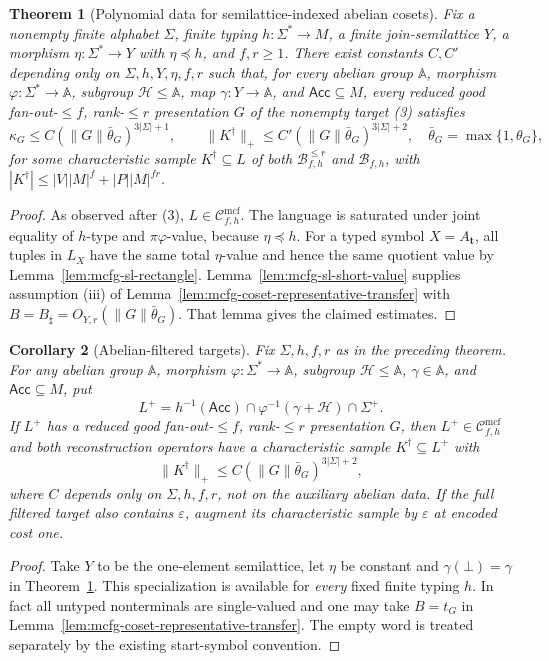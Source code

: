 \documentclass[11pt]{article}
\numberwithin{equation}{section}
\theoremstyle{plain}
\newtheorem{theorem}{Theorem}[section]
\newtheorem{corollary}[theorem]{Corollary}
\theoremstyle{definition}
\theoremstyle{remark}
\newcommand{\Cmcf}[2]{\mathcal{C}^{\mathrm{mcf}}_{#1,#2}}
\newcommand{\eps}{\varepsilon}
\theoremstyle{plain}
\begin{document}
\begin{theorem}[Polynomial data for semilattice-indexed abelian cosets]
\label{thm:mcfg-semilattice-twisted-polydata}
Fix a nonempty finite alphabet $\Sigma$, finite typing
$h:\Sigma^*\to M$, a finite join-semilattice $Y$, a morphism
$\eta:\Sigma^*\to Y$ with $\eta\preceq h$, and
$f,r\ge1$. There exist constants $C,C'$ depending only on
$\Sigma,h,Y,\eta,f,r$ such that, for every abelian group
$\mathbb A$, morphism $\varphi:\Sigma^*\to\mathbb A$,
subgroup $\mathcal H\le\mathbb A$, map $\gamma:Y\to\mathbb A$,
and $\mathsf{Acc}\subseteq M$, every reduced good
fan-out-$\le f$, rank-$\le r$ presentation $G$ of
the nonempty target (3) satisfies
\[
 \kappa_G\le C(\|G\|\bar\theta_G)^{3|\Sigma|+1},
 \qquad
 \|K^\dagger\|_+\le
 C'(\|G\|\bar\theta_G)^{3|\Sigma|+2},
 \quad\bar\theta_G=\max\{1,\theta_G\},
\]
for some characteristic sample $K^\dagger\subseteq L$
of both $\mathcal B^{\le r}_{f,h}$ and $\mathcal B_{f,h}$,
with $|K^\dagger|\le |V||M|^f+|P||M|^{fr}$.
\end{theorem}
\begin{proof}
As observed after (3), $L\in\Cmcf{f}{h}$.
The language is saturated under joint equality of
$h$-type and $\pi\varphi$-value, because $\eta\preceq h$.
For a typed symbol $X=A_{\mathbf t}$, all tuples in $L_X$
have the same total $\eta$-value and hence the same quotient
value by Lemma~\ref{lem:mcfg-sl-rectangle}.
Lemma~\ref{lem:mcfg-sl-short-value} supplies
assumption (iii) of Lemma~\ref{lem:mcfg-coset-representative-transfer}
with $B=B_\sharp=O_{Y,r}(\|G\|\bar\theta_G)$.
That lemma gives the claimed estimates.
\end{proof}

\begin{corollary}[Abelian-filtered targets]
\label{thm:mcfg-abelian-filter-data-v82}
Fix $\Sigma,h,f,r$ as in the preceding theorem.
For any abelian group $\mathbb A$, morphism
$\varphi:\Sigma^*\to\mathbb A$, subgroup
$\mathcal H\le\mathbb A$, $\gamma\in\mathbb A$, and
$\mathsf{Acc}\subseteq M$, put
\[
 L^+=h^{-1}(\mathsf{Acc})\cap
       \varphi^{-1}(\gamma+\mathcal H)\cap\Sigma^+.
\]
If $L^+$ has a reduced good fan-out-$\le f$,
rank-$\le r$ presentation $G$, then $L^+\in\Cmcf{f}{h}$
and both reconstruction operators have a characteristic
sample $K^\dagger\subseteq L^+$ with
\[
 \|K^\dagger\|_+
 \le C(\|G\|\bar\theta_G)^{3|\Sigma|+2},
\]
where $C$ depends only on $\Sigma,h,f,r$, not on the
auxiliary abelian data. If the full filtered target
also contains $\eps$, augment its characteristic
sample by $\eps$ at encoded cost one.
\end{corollary}
\begin{proof}
Take $Y$ to be the one-element semilattice, let
$\eta$ be constant and $\gamma(\bot)=\gamma$ in
Theorem~\ref{thm:mcfg-semilattice-twisted-polydata}.
This specialization is available for \emph{every}
fixed finite typing $h$. In fact all untyped
nonterminals are single-valued and one may take
$B=t_G$ in
Lemma~\ref{lem:mcfg-coset-representative-transfer}.
The empty word is treated separately by the existing
start-symbol convention.
\end{proof}
\end{document}
